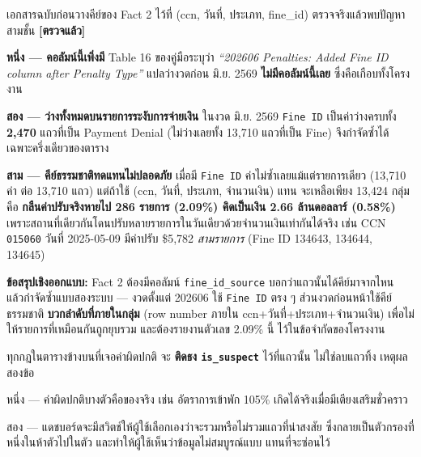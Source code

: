 \documentclass[11pt,a4paper]{article}
\newcommand{\code}[1]{\texttt{#1}}
\newcommand{\ok}{\textcolor{dw}{\textbf{[ตรวจแล้ว]}}}
\begin{document}
\begin{badbox}[title={\code{Fine ID} ใช้เป็นคีย์กำจัดซ้ำได้ไม่ตลอดช่วง --- ต้องมีสองระบบ}]
เอกสารฉบับก่อนวางคีย์ของ Fact 2 ไว้ที่ (ccn, วันที่, ประเภท, fine\_id)
ตรวจจริงแล้วพบปัญหาสามชั้น \ok{}

\vspace{0.4em}
\textbf{หนึ่ง --- คอลัมน์นี้เพิ่งมี} Table 16 ของคู่มือระบุว่า
\emph{``202606 Penalties: Added Fine ID column after Penalty Type''}
แปลว่างวดก่อน มิ.ย. 2569 \textbf{ไม่มีคอลัมน์นี้เลย} ซึ่งคือเกือบทั้งโครงงาน

\vspace{0.3em}
\textbf{สอง --- ว่างทั้งหมดบนรายการระงับการจ่ายเงิน} ในงวด มิ.ย. 2569
\code{Fine ID} เป็นค่าว่างครบทั้ง \textbf{2{,}470} แถวที่เป็น Payment Denial
(ไม่ว่างเลยทั้ง 13{,}710 แถวที่เป็น Fine) จึงกำจัดซ้ำได้เฉพาะครึ่งเดียวของตาราง

\vspace{0.3em}
\textbf{สาม --- คีย์ธรรมชาติทดแทนไม่ปลอดภัย} เมื่อมี \code{Fine ID}
ค่าไม่ซ้ำเลยแม้แต่รายการเดียว (13{,}710 ค่า ต่อ 13{,}710 แถว)
แต่ถ้าใช้ (ccn, วันที่, ประเภท, จำนวนเงิน) แทน จะเหลือเพียง 13{,}424 กลุ่ม
คือ \textbf{กลืนค่าปรับจริงหายไป 286 รายการ (2.09\%) คิดเป็นเงิน 2.66 ล้านดอลลาร์ (0.58\%)}
เพราะสถานที่เดียวกันโดนปรับหลายรายการในวันเดียวด้วยจำนวนเงินเท่ากันได้จริง
เช่น CCN \code{015060} วันที่ 2025-05-09 มีค่าปรับ \$5{,}782 \emph{สามรายการ}
(Fine ID 134643, 134644, 134645)

\vspace{0.4em}
\textbf{ข้อสรุปเชิงออกแบบ:} Fact 2 ต้องมีคอลัมน์ \code{fine_id_source}
บอกว่าแถวนั้นได้คีย์มาจากไหน แล้วกำจัดซ้ำแบบสองระบบ ---
งวดตั้งแต่ 202606 ใช้ \code{Fine ID} ตรง ๆ ส่วนงวดก่อนหน้าใช้คีย์ธรรมชาติ
\textbf{บวกลำดับที่ภายในกลุ่ม} (row number ภายใน ccn+วันที่+ประเภท+จำนวนเงิน)
เพื่อไม่ให้รายการที่เหมือนกันถูกยุบรวม และต้องรายงานตัวเลข 2.09\% นี้
ไว้ในข้อจำกัดของโครงงาน
\end{badbox}

\begin{keybox}[title={ติดธง ดีกว่าลบทิ้ง}]
ทุกกฎในตารางข้างบนที่เจอค่าผิดปกติ จะ \textbf{ติดธง \code{is_suspect}}
ไว้ที่แถวนั้น ไม่ใช่ลบแถวทิ้ง เหตุผลสองข้อ

\vspace{0.3em}
หนึ่ง --- ค่าผิดปกติบางตัวคือของจริง เช่น อัตราการเข้าพัก 105\%
เกิดได้จริงเมื่อมีเตียงเสริมชั่วคราว

\vspace{0.3em}
สอง --- แดชบอร์ดจะมีสวิตช์ให้ผู้ใช้เลือกเองว่าจะรวมหรือไม่รวมแถวที่น่าสงสัย
ซึ่งกลายเป็นตัวกรองที่หนึ่งในห้าตัวไปในตัว และทำให้ผู้ใช้เห็นว่าข้อมูลไม่สมบูรณ์แบบ
แทนที่จะซ่อนไว้
\end{keybox}
\end{document}
